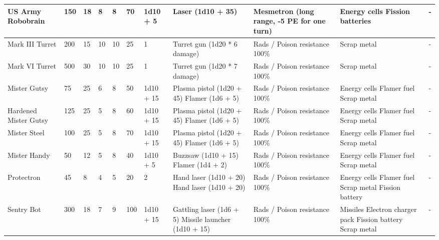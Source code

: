 \begin{longtable}{|p{2.5cm}|p{0.6cm}|p{0.6cm}|p{0.6cm}|p{0.6cm}|p{0.6cm}|p{1.5cm}|p{4cm}|p{4cm}|p{4cm}|p{2.3cm}|}
\hline
US Army Robobrain & 150 & 18 & 8 & 8 & 70 & 1d10 + 5 & Laser (1d10 + 35) & Mesmetron (long range, -5 PE for one turn) & Energy cells \newline Fission batteries & - \\
\hline
Mark III Turret & 200 & 15 & 10 & 10 & 25 & 1 & Turret gun (1d20 * 6 damage) & Rads / Poison resistance 100\% & Scrap metal & - \\
\hline
Mark VI Turret & 500 & 30 & 10 & 10 & 25 & 1 & Turret gun (1d20 * 7 damage) & Rads / Poison resistance 100\% & Scrap metal & - \\
\hline
Mister Gutsy & 75 & 25 & 6 & 8 & 50 & 1d10 + 15 & Plasma pistol (1d20 + 45) \newline Flamer (1d6 + 5) & Rads / Poison resistance 100\% & Energy cells \newline Flamer fuel \newline Scrap metal & - \\
\hline
Hardened Mister Gutsy & 125 & 25 & 5 & 8 & 60 & 1d10 + 15 & Plasma pistol (1d20 + 45) \newline Flamer (1d6 + 5) & Rads / Poison resistance 100\% & Energy cells \newline Flamer fuel \newline Scrap metal & - \\
\hline
Mister Steel & 100 & 25 & 5 & 8 & 70 & 1d10 + 15 & Plasma pistol (1d20 + 45) \newline Flamer (1d6 + 5) & Rads / Poison resistance 100\% & Energy cells \newline Flamer fuel \newline Scrap metal & - \\
\hline
Mister Handy & 50 & 12 & 5 & 8 & 40 & 1d10 + 5 & Buzzsaw (1d10 + 15) \newline Flamer (1d4 + 2) & Rads / Poison resistance 100\% & Energy cells \newline Flamer fuel \newline Scrap metal & - \\
\hline
Protectron & 45 & 8 & 4 & 5 & 20 & 2 & Hand laser (1d10 + 20) \newline Hand laser (1d10 + 20) & Rads / Poison resistance 100\% & Energy cells \newline Flamer fuel \newline Scrap metal \newline Fission battery & - \\
\hline
Sentry Bot & 300 & 18 & 7 & 9 & 100 & 1d10 + 15 & Gattling laser (1d6 + 5) \newline Missile launcher (1d10 + 15) & Rads / Poison resistance 100\% & Missiles \newline Electron charger pack \newline Fission battery \newline Scrap metal & - \\

\end{longtable}
